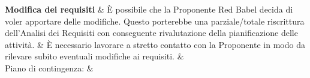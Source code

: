 \documentclass[PianoDiProgetto.tex]{subfiles}
\begin{document}
\begin{longtabu}
	
	 \textbf{Modifica dei requisiti} 
	&
	{\small È possibile che la Proponente Red Babel decida di voler apportare delle modifiche. Questo porterebbe una parziale/totale riscrittura dell'Analisi dei Requisiti con conseguente rivalutazione della pianificazione delle attività.}
	&
	{\small È necessario lavorare a stretto contatto con la Proponente in modo da rilevare subito eventuali modifiche ai requisiti.}
	&
	  \\
	 Piano di contingenza:
	&
	\\
	\hhline{====}
		
\end{longtabu}
\end{document}
